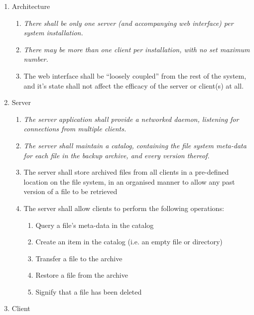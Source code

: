 \begin{enumerate}
    \item Architecture
        \begin{enumerate}
            \item \emph{There shall be only one server (and accompanying web
                interface) per system installation.}
            \item \emph{There may be more than one client per installation,
                with no set maximum number.}
            \item The web interface shall be ``loosely coupled'' from the rest
                of the system, and it's state shall not affect the efficacy of
                the server or client(s) at all.
        \end{enumerate}
    \item Server
        \begin{enumerate}
            \item \emph{The server application shall provide a networked
                daemon, listening for connections from multiple clients.}
            \item \emph{The server shall maintain a catalog, containing the
                file system meta-data for each file in the backup archive, and
                every version thereof.}
            \item The server shall store archived files from all clients in
                a pre-defined location on the file system, in an organised
                manner to allow any past version of a file to be retrieved
            \item The server shall allow clients to perform the following
                operations:
                \begin{enumerate}
                    \item Query a file's meta-data in the catalog
                    \item Create an item in the catalog (i.e. an empty file or
                        directory)
                    \item Transfer a file to the archive
                    \item Restore a file from the archive
                    \item Signify that a file has been deleted
                \end{enumerate}
        \end{enumerate}
    \item Client

\end{enumerate}
